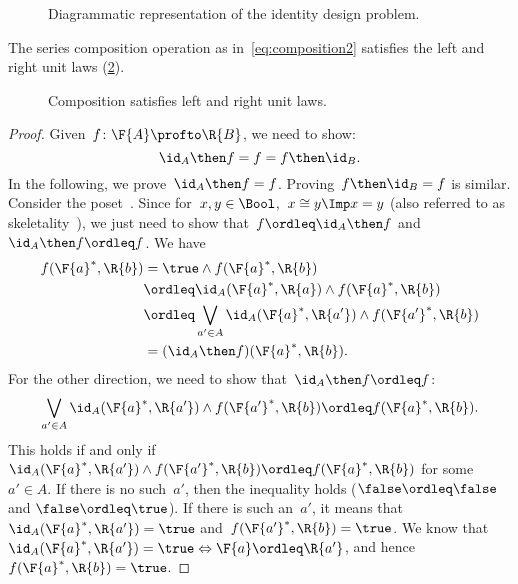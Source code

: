 \begin{figure}[h!]
  \begin{center}
  \end{center}
  \caption{Diagrammatic representation of the identity design problem. \label{fig:identitydp}}
\end{figure}

\begin{lemma}\label{lem:compositionunital}
  The series composition operation as in~\cref{eq:composition2} satisfies the left and right unit laws (\cref{fig:compositionunital}).
\end{lemma}
  \begin{figure}[h!]
    \begin{center}
    \end{center}
    \caption{Composition satisfies left and right unit laws. \label{fig:compositionunital}}
  \end{figure}
\begin{proof}
  Given~$f\colon \F{A}\profto \R{B}$, we need to show:
  \begin{equation*}
    \id_A \then f= f = f\then \id_B.
  \end{equation*}
  In the following, we prove~$\id_A \then f = f$. Proving~$f\then \id_B=f$ is similar.
  Consider the poset~\Bool. Since for~$x,y\in \Bool$,~$x\cong y \Imp x=y$ (also referred to as skeletality~\cite{fong2019}), we just need to show that~$f\ordleq \id_A\then f$ and~$\id_A\then f\ordleq f$.
  We have
  \begin{equation*}
    \begin{aligned}
      f(\F{a}^*,\R{b})&=\true \wedge f(\F{a}^*,\R{b})\\
      &\ordleq \id_A(\F{a}^*,\R{a}) \wedge f(\F{a}^*,\R{b})\\
      &\ordleq \bigvee_{a'\in A}\id_A(\F{a}^*,\R{a'})\wedge f(\F{a'}^*,\R{b})\\
      &=(\id_A\then f)(\F{a}^*,\R{b}).
    \end{aligned}
  \end{equation*}
  For the other direction, we need to show that~$\id_A\then f\ordleq f$:
  \begin{equation*}
    \bigvee_{a'\in A}\id_A(\F{a}^*,\R{a'})\wedge f(\F{a'}^*,\R{b}) \ordleq f(\F{a}^*,\R{b}).
  \end{equation*}
  This holds if and only if~$\id_A(\F{a}^*,\R{a'})\wedge f(\F{a'}^*,\R{b}) \ordleq f(\F{a}^*,\R{b})$ for some~$a'\in A$. If there is no such~$a'$, then the inequality holds ($\false \ordleq \false$ and $\false \ordleq \true$). If there is such an~$a'$, it means that~$\id_A(\F{a}^*,\R{a'})=\true$ and~$f(\F{a'}^*,\R{b})=\true$. We know that~$\id_A(\F{a}^*,\R{a'})=\true \Leftrightarrow \F{a}\ordleq \R{a'}$, and hence~$f(\F{a}^*,\R{b})=\true$.
\end{proof}
